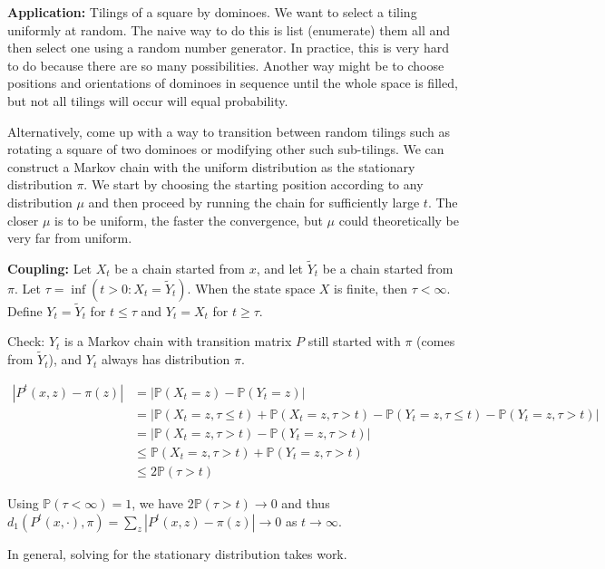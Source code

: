 \documentclass{article}
\newcommand{\I}{\infty}
\newcommand{\ta}{\tau}
\newcommand{\PP}{{\mathbb{P}}}
\begin{document}
\vspace{10mm}
\textbf{Application:} Tilings of a square by dominoes. We want to select a tiling uniformly at random. The naive way to do this is list (enumerate) them all and then select one using a random number generator. In practice, this is very hard to do because there are so many possibilities. Another way might be to choose positions and orientations of dominoes in sequence until the whole space is filled, but not all tilings will occur will equal probability. 

\vspace{5mm}
Alternatively, come up with a way to transition between random tilings such as rotating a square of two dominoes or modifying other such sub-tilings. We can construct a Markov chain with the uniform distribution as the stationary distribution $\pi$. We start by choosing the starting position according to any distribution $\mu$ and then proceed by running the chain for sufficiently large $t$. The closer $\mu$ is to be uniform, the faster the convergence, but $\mu$ could theoretically be very far from uniform.

\vspace{10mm}
\textbf{Coupling:} Let $X_t$ be a chain started from $x$, and let $\tilde{Y}_t$ be a chain started from $\pi$. Let $\ta=\inf(t>0:X_t=\tilde{Y}_t)$. When the state space $X$ is finite, then $\ta<\I$. Define $Y_t=\tilde{Y}_t$ for $t\leq \ta$ and $Y_t=X_t$ for $t\geq \ta$. 


\vspace{5mm}
Check: $Y_t$ is a Markov chain with transition matrix $P$ still started with $\pi$ (comes from $\tilde{Y}_t$), and $Y_t$ always has distribution $\pi$. 

$$\begin{aligned}
|P^t(x,z)-\pi(z)|&=|\PP(X_t=z)-\PP(Y_t=z)|\\&=|\PP(X_t=z,\ta\leq t)+\PP(X_t=z,\ta> t)-\PP(Y_t=z,\ta\leq t)-\PP(Y_t=z,\ta> t)|\\&=|\PP(X_t=z,\ta>t)-\PP(Y_t=z,\ta> t)|\\&\leq \PP(X_t=z,\ta>t)+\PP(Y_t=z,\ta>t)\\&\leq 2\PP(\ta>t)
\end{aligned}$$

Using $\PP(\ta<\I)=1$, we have $2\PP(\ta>t)\to 0$ and thus $d_1(P^t(x,\cdot),\pi)=\sum_z|P^t(x,z)-\pi(z)|\to 0$ as $t\to \I$.

\vspace{10mm}
In general, solving for the stationary distribution takes work.
\end{document}
